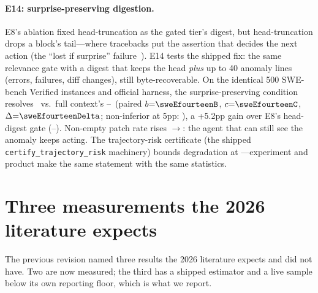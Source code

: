 \documentclass{article}
\newcommand{\sweEeightFullPass}{--}\newcommand{\sweEeightFullResolved}{--}%
\newcommand{\sweEeightGatedPass}{--}\newcommand{\sweEeightGatedResolved}{--}%
\begin{document}
\paragraph{E14: surprise-preserving digestion.}
E8's ablation fixed head-truncation as the gated tier's digest, but head-truncation drops a
block's tail---where tracebacks put the assertion that decides the next action (the ``lost if
surprise'' failure~\cite{silverbullet}). E14 tests the shipped fix: the same relevance gate with
a digest that keeps the head \emph{plus} up to 40 anomaly lines (errors, failures, diff changes),
still byte-recoverable. On the identical 500 SWE-bench Verified instances and official harness,
the surprise-preserving condition resolves \sweEfourteenPass\ vs.\ full context's \sweEeightFullPass\
(paired $b{=}\sweEfourteenB$, $c{=}\sweEfourteenC$, $\Delta{=}\sweEfourteenDelta$; non-inferior at
5pp: \sweEfourteenNI), a +5.2pp gain over E8's head-digest gate (\sweEeightGatedPass). Non-empty
patch rate rises \sweEeightGatedPatchRate$\rightarrow$\sweEfourteenPatchRate: the agent that can
still see the anomaly keeps acting. The trajectory-risk certificate (the shipped
\texttt{certify\_trajectory\_risk} machinery) bounds degradation at
\sweEfourteenTrajBound---experiment and product make the same statement with the same statistics.

\section{Three measurements the 2026 literature expects}
\label{sec:todo}

The previous revision named three results the 2026 literature expects and did not have. Two
are now measured; the third has a shipped estimator and a live sample below its own
reporting floor, which is what we report.
\end{document}
